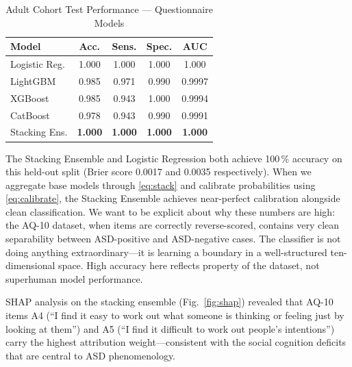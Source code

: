 \documentclass[conference]{IEEEtran}
\begin{document}
\begin{table}[htbp]
\caption{Adult Cohort Test Performance --- Questionnaire Models}
\label{tab:qresults}
\centering
\renewcommand{\arraystretch}{1.15}
\begin{tabular}{lcccc}
\toprule
\textbf{Model} & \textbf{Acc.} & \textbf{Sens.} & \textbf{Spec.} & \textbf{AUC} \\
\midrule
Logistic Reg.    & 1.000 & 1.000 & 1.000 & 1.000 \\
LightGBM         & 0.985 & 0.971 & 0.990 & 0.9997 \\
XGBoost          & 0.985 & 0.943 & 1.000 & 0.9994 \\
CatBoost         & 0.978 & 0.943 & 0.990 & 0.9991 \\
Stacking Ens.    & \textbf{1.000} & \textbf{1.000} & \textbf{1.000} & \textbf{1.000} \\
\bottomrule
\end{tabular}
\end{table}

The Stacking Ensemble and Logistic Regression both achieve 100\,\% accuracy on this held-out split (Brier score 0.0017 and 0.0035 respectively). When we aggregate base models through \eqref{eq:stack} and calibrate probabilities using \eqref{eq:calibrate}, the Stacking Ensemble achieves near-perfect calibration alongside clean classification. We want to be explicit about why these numbers are high: the AQ-10 dataset, when items are correctly reverse-scored, contains very clean separability between ASD-positive and ASD-negative cases. The classifier is not doing anything extraordinary---it is learning a boundary in a well-structured ten-dimensional space. High accuracy here reflects property of the dataset, not superhuman model performance.

SHAP analysis on the stacking ensemble (Fig.~\ref{fig:shap}) \cite{lundberg2017shap} revealed
that AQ-10 items A4 (``I find it easy to work out what someone is
thinking or feeling just by looking at them'') and A5 (``I find it
difficult to work out people's intentions'') carry the highest
attribution weight---consistent with the social cognition deficits
that are central to ASD phenomenology.
\end{document}

